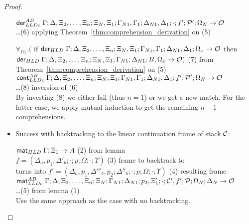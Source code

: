 \begin{proof}
\begin{itemize}[leftmargin=*]
      $\mathsf{der}_{LLDc}^{AB} \; \Gamma; \Delta, \Xi_2, \dotsc, \Xi_n; \Xi_N, \Xi_1; \Gamma_{N1}, \Gamma_1; \Delta_{N1}, \Delta_1;
            \cdot; f'; \mathcal{P'}; \Omega_N \rightarrow \mathcal{O}$
      \\ \dots \hfill (6) applying Theorem~\ref{thm:comprehension_derivation} on (5)

      $\forall_{\Omega_x}. ($ if $\mathsf{der}_{HLD} \; \Gamma; \Delta, \Xi_2, \dotsc, \Xi_n; \Xi_N, \Xi_1;
            \Gamma_{N1}, \Gamma_1; \Delta_{N1}, \Delta_1; \Omega_x \rightarrow
            \mathcal{O}$ then \\ \hspace*{0.5cm} $\mathsf{der}_{HLD} \; \Gamma;
            \Delta, \Xi_2, \dotsc, \Xi_n; \Xi_N, \Xi_1; \Gamma_{N1}; \Delta_{N1}; B, \Omega_x
            \rightarrow \mathcal{O})$ \hfill (7) from
      Theorem~\ref{thm:comprehension_derivation} on (5) \\

      $\mathsf{cont}_{LLDc}^{AB} \; \Gamma; \Delta, \Xi_2, \dotsc, \Xi_n; \Xi_N, \Xi_1; \Gamma_{N1},
         \Gamma_1; \Delta_{N1}, \Delta_1; f'; \mathcal{P'}; \Omega_N
         \rightarrow \mathcal{O}$\\ \dots \hfill (8) inversion of (6) \\
        
        By inverting (8) we either fail (thus $n = 1$) or we get a new match.
        For the latter case, we apply mutual induction to get the remaining $n -
        1$ comprehensions.
      
   \item Success with backtracking to the linear continuation frame of stack $\mathcal{C}$:
      
      $\mathsf{mat}_{HLD} \; \Gamma; \Xi_1 \rightarrow A$ \hfill (2) from lemma \\

      $f = (\Delta_a, p_1; \Delta'_b; \cdot; p; \Omega; \cdot; \Upsilon)$ \hfill (3) frame to backtrack to \\
      turns into $f' = (\Delta_a, p_1, \Delta'''_b, p_2; \Delta''_b; \cdot; p; \Omega; \cdot; \Upsilon)$ \hfill (4) resulting frame \\

      $\mathsf{mat}_{LLDc}^{AB} \; \Gamma; \Delta, \Xi_2, \dotsc, \Xi_n; \Xi_N; \Gamma_{N1};
\Delta_{N1}; p_2, \Xi'_1; \cdot; \mathcal{C'}, f'; \mathcal{P}; \Omega_N; \Delta_N \rightarrow
\mathcal{O}$\\ \dots \hfill (5) from lemma (1) \\
      
      Use the same approach as the case with no backtracking.
      

\end{itemize}
\end{proof}
